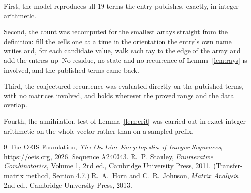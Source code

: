 \documentclass[11pt,a4paper]{article}
\theoremstyle{plain}
\theoremstyle{definition}
\begin{document}
First, the model reproduces all $19$ terms the entry publishes, exactly, in integer
arithmetic.

Second, the count was recomputed for the smallest arrays straight from the definition: fill the
cells one at a time in the orientation the entry's own name writes and, for each candidate
value, walk each ray to the edge of the array and add the entries up. No residue, no state and
no recurrence of Lemma~\ref{lem:rays} is involved, and the published terms came back.

Third, the conjectured recurrence was evaluated directly on the published terms, with no
matrices involved, and holds wherever the proved range and the data overlap.

Fourth, the annihilation test of Lemma~\ref{lem:crit} was carried out in exact integer
arithmetic on the whole vector rather than on a sampled prefix.

\begin{thebibliography}{9}
 The OEIS Foundation, \emph{The On-Line Encyclopedia of Integer
Sequences}, \url{https://oeis.org}, 2026. Sequence A240343.
 R.~P.~Stanley, \emph{Enumerative Combinatorics}, Volume 1, 2nd ed.,
Cambridge University Press, 2011. (Transfer-matrix method, Section 4.7.)
 R.~A.~Horn and C.~R.~Johnson, \emph{Matrix Analysis}, 2nd ed., Cambridge
University Press, 2013.
\end{thebibliography}
\end{document}
